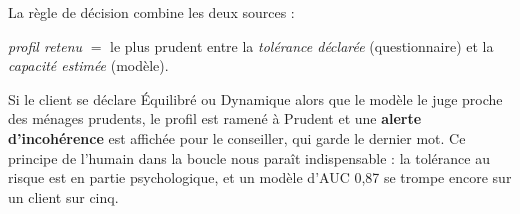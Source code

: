 La règle de décision combine les deux sources :
\begin{center}
  \emph{profil retenu} $=$ le plus prudent entre la \emph{tolérance déclarée} (questionnaire) et la \emph{capacité estimée} (modèle).
\end{center}
Si le client se déclare Équilibré ou Dynamique alors que le modèle le juge proche des ménages prudents, le profil est ramené à Prudent et une \textbf{alerte d'incohérence} est affichée pour le conseiller, qui garde le dernier mot. Ce principe de l'humain dans la boucle nous paraît indispensable : la tolérance au risque est en partie psychologique, et un modèle d'AUC 0,87 se trompe encore sur un client sur cinq.
